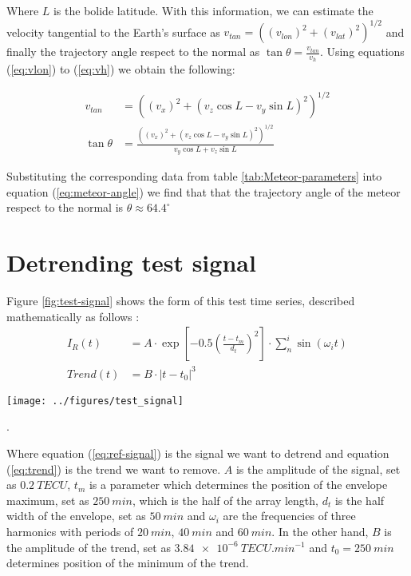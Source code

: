 Where $L$ is the bolide latitude. With this information, we can estimate the velocity tangential to the Earth's surface as $v_{tan} = \left((v_{lon})^2 + (v_{lat})^2\right)^{1/2}$ and finally the trajectory angle respect to the normal as $\tan\theta = \frac{v_{tan}}{v_h}$. Using equations (\ref{eq:vlon}) to (\ref{eq:vh}) we obtain the following:

\begin{align}
    v_{tan} &= \left((v_x)^2 + (v_z\cos{L}-v_y\sin{L})^2\right)^{1/2} \\
    \tan\theta &= \frac{\left((v_x)^2 + (v_z\cos{L}-v_y\sin{L})^2\right)^{1/2}}{v_y\cos{L} + v_z\sin{L}}  \label{eq:meteor-angle}
\end{align}

Substituting the corresponding data from table \ref{tab:Meteor-parameters} into equation (\ref{eq:meteor-angle}) we find that that the trajectory angle of the meteor respect to the normal is $\theta \approx 64.4^{\circ}$

\section{Detrending test signal}
\label{app:test-signal}
Figure \ref{fig:test-signal} shows the form of this test time series, described mathematically as follows \citep{Boris:2020}:
 \begin{align}
     I_R(t) &= A\cdot \exp\left[-0.5\left(\frac{t-t_m}{d_t}\right)^2\right]\cdot \sum^{i}_{n}\sin\left(\omega_i t\right) \label{eq:ref-signal}\\
     Trend(t) &= B\cdot \left|t - t_0\right|^3 \label{eq:trend}
 \end{align}
 
 \begin{figure*}
     \centering
     \texttt{[image: ../figures/test\_signal]}
     \caption{Initial setup for testing detrending method. a) Reference signal given by equation (\ref{eq:ref-signal}). b) Superposition between a) and the trend given by (\ref{eq:trend})}.
     \label{fig:test-signal}
 \end{figure*}
 
 Where equation (\ref{eq:ref-signal}) is the signal we want to detrend and equation (\ref{eq:trend}) is the trend we want to remove. $A$ is the amplitude of the signal, set as $\SI{0.2}{TECU}$, $t_m$ is a parameter which determines the position of the envelope maximum, set as $\SI{250}{min}$, which is the half of the array length, $d_t$ is the half width of the envelope, set as $\SI{50}{min}$ and $\omega_i$ are the frequencies of three harmonics with periods of $\SI{20}{min}$, $\SI{40}{min}$ and $\SI{60}{min}$. In the other hand, $B$ is the amplitude of the trend, set as $\SI{3.84e-6}{TECU.min^{-1}}$ and $t_0=\SI{250}{min}$ determines position of the minimum of the trend.
 
